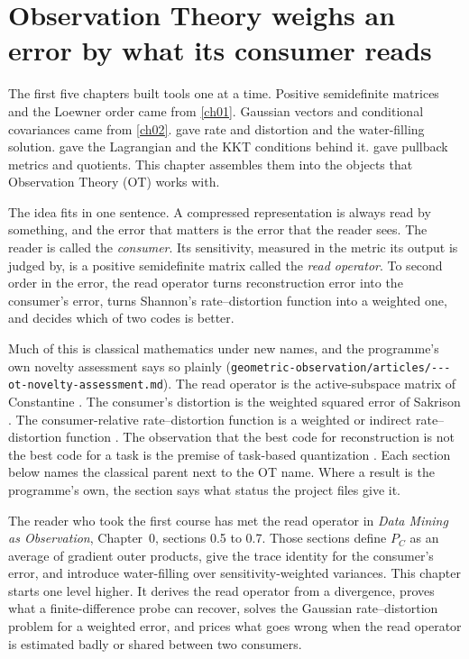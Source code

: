 \chapter{Observation Theory weighs an error by what its consumer reads}\label{ch06}

The first five chapters built tools one at a time. Positive semidefinite matrices and the Loewner order came from \cref{ch01}. Gaussian vectors and conditional covariances came from \cref{ch02}.  gave rate and distortion and the water-filling solution.  gave the Lagrangian and the KKT conditions behind it.  gave pullback metrics and quotients. This chapter assembles them into the objects that Observation Theory (OT) works with.

The idea fits in one sentence. A compressed representation is always read by something, and the error that matters is the error that the reader sees. The reader is called the \emph{consumer}. Its sensitivity, measured in the metric its output is judged by, is a positive semidefinite matrix called the \emph{read operator}. To second order in the error, the read operator turns reconstruction error into the consumer's error, turns Shannon's rate--distortion function into a weighted one, and decides which of two codes is better.

Much of this is classical mathematics under new names, and the programme's own novelty assessment says so plainly (\texttt{geometric-\allowbreak observation/\allowbreak articles/---\allowbreak ot-\allowbreak novelty-\allowbreak assessment.md}). The read operator is the active-subspace matrix of Constantine \cite{constantine2014,constantine2015}. The consumer's distortion is the weighted squared error of Sakrison \cite{sakrison1968}. The consumer-relative rate--distortion function is a weighted or indirect rate--distortion function \cite{dobrushin1962,wolfziv1970,witsenhausen1980}. The observation that the best code for reconstruction is not the best code for a task is the premise of task-based quantization \cite{shlezinger2019}. Each section below names the classical parent next to the OT name. Where a result is the programme's own, the section says what status the project files give it.

The reader who took the first course has met the read operator in \emph{Data Mining as Observation}, Chapter~0, sections 0.5 to 0.7. Those sections define $P_C$ as an average of gradient outer products, give the trace identity for the consumer's error, and introduce water-filling over sensitivity-weighted variances. This chapter starts one level higher. It derives the read operator from a divergence, proves what a finite-difference probe can recover, solves the Gaussian rate--distortion problem for a weighted error, and prices what goes wrong when the read operator is estimated badly or shared between two consumers.

